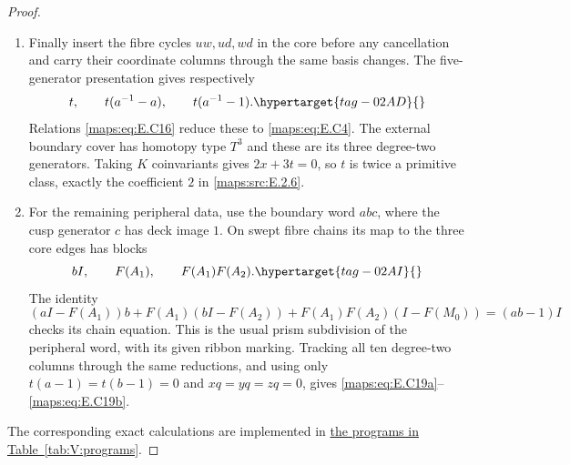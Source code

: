 \documentclass[11pt,a4paper]{article}
\numberwithin{equation}{section}
\theoremstyle{definition}
\begin{document}
\begin{proof}
\begin{enumerate}[label=\arabic*.,leftmargin=*]
\item Finally insert the fibre cycles $uw,ud,wd$ in
the core before any cancellation and carry their
coordinate columns through the same basis changes.
The five-generator presentation gives respectively
\begin{equation}
 t,\qquad t(a^{-1}-a),\qquad t(a^{-1}-1).
 \hypertarget{tag-02AD}{}\label{maps:eq:E.C18}
\end{equation}
Relations \eqref{maps:eq:E.C16} reduce these to \eqref{maps:eq:E.C4}. The external
boundary cover has homotopy type $T^3$ and these are
its three degree-two generators. Taking $K$ coinvariants gives $2x+3t=0$, so $t$ is twice a
primitive class, exactly the coefficient $2$ in \ref{maps:src:E.2.6}.

\item For the remaining peripheral data, use the
boundary word $abc$, where the cusp generator $c$
has deck image $1$. On swept fibre chains its map to
the three core edges has blocks
\begin{equation}
                 bI,\qquad F(A_1),\qquad F(A_1)F(A_2).
 \hypertarget{tag-02AI}{}\label{maps:eq:E.C21}
\end{equation}
The identity
\[
 (aI-F(A_1))b+F(A_1)(bI-F(A_2))
       +F(A_1)F(A_2)(I-F(M_0))=(ab-1)I
\]
checks its chain equation. This is the usual prism
subdivision of the peripheral word, with
its given ribbon marking. Tracking all ten
degree-two columns through the same reductions,
and using only $t(a-1)=t(b-1)=0$ and
$xq=yq=zq=0$, gives \eqref{maps:eq:E.C19a}--\eqref{maps:eq:E.C19b}.

\end{enumerate}
The corresponding exact calculations are implemented in \hyperlink{prog:V:quadratic}{the programs in Table~\ref*{tab:V:programs}}.
\end{proof}
\end{document}
